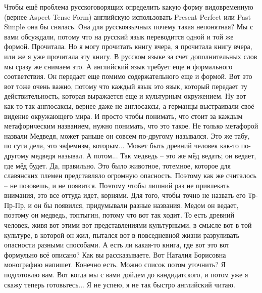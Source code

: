 \documentclass[main.tex]{subfiles}
\begin{document}
Чтобы ещё проблема русскоговорящих определить какую форму видовременную (вернее Aspect Tense Form) английскую использовать Present Perfect или Past Simple она бы снялась.
Она для русскоязычных почему такая непонятная?
Мы с вами обсуждали, потому что на русский язык переводится одной и той же формой.
Прочитала.
Но я могу прочитать книгу вчера, я прочитала книгу вчера, или же я уже прочитала эту книгу.
В русском языке за счет дополнительных слов мы сразу же снимаем это.
А английский язык требует еще и формального соответствия.
Он передает еще помимо содержательного еще и формой.
Вот это вот тоже очень важно, потому что каждый язык это язык, который передает ту действительность, которая выражается еще и культурным окружением.
Ну вот как-то так англосаксы, вернее даже не англосаксы, а германцы выстраивали своё видение окружающего мира.
И просто чтобы понимать, что стоит за каждым метафорическим названием, нужно понимать, что это такое.
Не только метафорой назвали Медведя, может раньше он совсем по-другому назывался.
Это же табу, по сути дела, это эвфемизм, которым...
Может быть древний человек как-то по-другому медведя называл.
А потом...
Так медведь -- это же мёд ведать; он ведает, где мёд будет.
Да, правильно.
Это было животное, тотемное, которое для славянских племен представляло огромную опасность.
Поэтому как же считалось -- не позовешь, и не появится.
Поэтому чтобы лишний раз не привлекать внимания, это все оттуда идет, корнями.
Для того, чтобы точно не назвать его Тр-Пр-Пр, и он бы появился, придумывали разные названия.
Медом он ведает, поэтому он медведь, топтыгин, потому что вот так ходит.
То есть древний человек, живя вот этими вот представлениями культурными, в смысле вот в той культуре, в которой он жил, пытался вот в повседневной жизни разруливать опасности разными способами.
А есть ли какая-то книга, где вот это вот формульно всё описано? Как вы рассказываете.
Вот Наталия Борисовна монографию напишет.
Конечно есть.
Можно список потом уточнить?
Я подготовлю вам.
Вот когда мы с вами дойдем до кандидатского, и потом уже я скажу теперь готовьтесь...
Я не успею, я не так быстро английский читаю.
\end{document}
